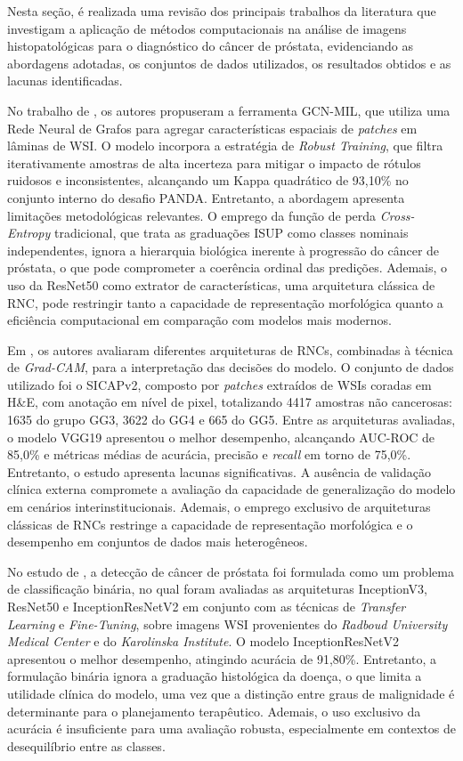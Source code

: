 Nesta seção, é realizada uma revisão dos principais trabalhos da literatura que investigam a aplicação de métodos computacionais na análise de imagens histopatológicas para o diagnóstico do câncer de próstata, evidenciando as abordagens adotadas, os conjuntos de dados utilizados, os resultados obtidos e as lacunas identificadas.

No trabalho de \cite{Xiang2023Prostate}, os autores propuseram a ferramenta GCN-MIL, que utiliza uma Rede Neural de Grafos para agregar características espaciais de \textit{patches} em lâminas de WSI. O modelo incorpora a estratégia de \textit{Robust Training}, que filtra iterativamente amostras de alta incerteza para mitigar o impacto de rótulos ruidosos e inconsistentes, alcançando um Kappa quadrático de 93,10\% no conjunto interno do desafio PANDA. Entretanto, a abordagem apresenta limitações metodológicas relevantes. O emprego da função de perda \textit{Cross-Entropy} tradicional, que trata as graduações ISUP como classes nominais independentes, ignora a hierarquia biológica inerente à progressão do câncer de próstata, o que pode comprometer a coerência ordinal das predições. Ademais, o uso da ResNet50 como extrator de características, uma arquitetura clássica de RNC, pode restringir tanto a capacidade de representação morfológica quanto a eficiência computacional em comparação com modelos mais modernos.

Em \cite{kosoko2024xai_prostate}, os autores avaliaram diferentes arquiteturas de RNCs, combinadas à técnica de \textit{Grad-CAM}, para a interpretação das decisões do modelo. O conjunto de dados utilizado foi o SICAPv2, composto por \textit{patches} extraídos de WSIs coradas em H\&E, com anotação em nível de pixel, totalizando 4417 amostras não cancerosas: 1635 do grupo GG3, 3622 do GG4 e 665 do GG5. Entre as arquiteturas avaliadas, o modelo VGG19 apresentou o melhor desempenho, alcançando AUC-ROC de 85,0\% e métricas médias de acurácia, precisão e \textit{recall} em torno de 75,0\%. Entretanto, o estudo apresenta lacunas significativas. A ausência de validação clínica externa compromete a avaliação da capacidade de generalização do modelo em cenários interinstitucionais. Ademais, o emprego exclusivo de arquiteturas clássicas de RNCs restringe a capacidade de representação morfológica e o desempenho em conjuntos de dados mais heterogêneos.

No estudo de \cite{afifi2024prostate}, a detecção de câncer de próstata foi formulada como um problema de classificação binária, no qual foram avaliadas as arquiteturas InceptionV3, ResNet50 e InceptionResNetV2 em conjunto com as técnicas de \textit{Transfer Learning} e \textit{Fine-Tuning}, sobre imagens WSI provenientes do \textit{Radboud University Medical Center} e do \textit{Karolinska Institute}. O modelo InceptionResNetV2 apresentou o melhor desempenho, atingindo acurácia de 91,80\%. Entretanto, a formulação binária ignora a graduação histológica da doença, o que limita a utilidade clínica do modelo, uma vez que a distinção entre graus de malignidade é determinante para o planejamento terapêutico. Ademais, o uso exclusivo da acurácia é insuficiente para uma avaliação robusta, especialmente em contextos de desequilíbrio entre as classes.

